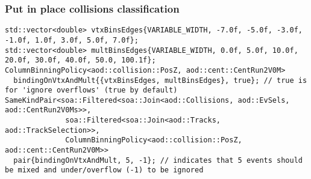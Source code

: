 \documentclass[14pt,aspectratio=169,t]{beamer}
\begin{document}
\begin{frame}[fragile]
  \frametitle{Put in place collisions classification}
  
  \vspace{-0.0in}
  {\tiny\color{blue}
  \begin{verbatim}
std::vector<double> vtxBinsEdges{VARIABLE_WIDTH, -7.0f, -5.0f, -3.0f, -1.0f, 1.0f, 3.0f, 5.0f, 7.0f};
std::vector<double> multBinsEdges{VARIABLE_WIDTH, 0.0f, 5.0f, 10.0f, 20.0f, 30.0f, 40.0f, 50.0, 100.1f};
ColumnBinningPolicy<aod::collision::PosZ, aod::cent::CentRun2V0M> 
  bindingOnVtxAndMult{{vtxBinsEdges, multBinsEdges}, true}; // true is for 'ignore overflows' (true by default)
SameKindPair<soa::Filtered<soa::Join<aod::Collisions, aod::EvSels, aod::CentRun2V0Ms>>, 
              soa::Filtered<soa::Join<aod::Tracks, aod::TrackSelection>>, 
              ColumnBinningPolicy<aod::collision::PosZ, aod::cent::CentRun2V0M>> 
  pair{bindingOnVtxAndMult, 5, -1}; // indicates that 5 events should be mixed and under/overflow (-1) to be ignored

  \end{verbatim}}
\end{frame}
\end{document}
